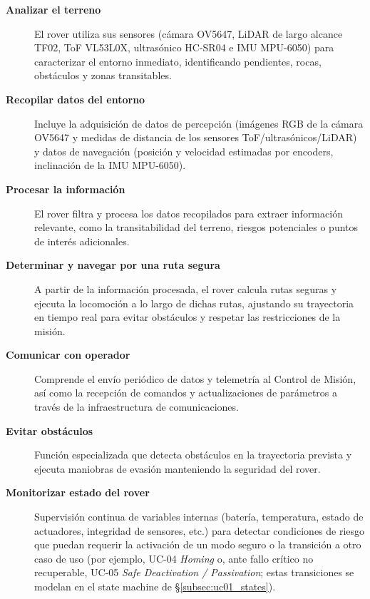 \begin{description}
  \item[\textbf{Analizar el terreno}]
  El rover utiliza sus sensores (cámara OV5647, LiDAR de largo alcance TF02, ToF VL53L0X, ultrasónico HC-SR04 e IMU MPU-6050) para caracterizar el entorno inmediato, identificando pendientes, rocas, obstáculos y zonas transitables.

  \item[\textbf{Recopilar datos del entorno}]
  Incluye la adquisición de datos de percepción (imágenes RGB de la cámara OV5647 y medidas de distancia de los sensores ToF/ultrasónicos/LiDAR) y datos de navegación (posición y velocidad estimadas por encoders, inclinación de la IMU MPU-6050).

  \item[\textbf{Procesar la información}] 
  El rover filtra y procesa los datos recopilados para extraer información relevante, 
  como la transitabilidad del terreno, riesgos potenciales o puntos de interés adicionales.

  \item[\textbf{Determinar y navegar por una ruta segura}] 
  A partir de la información procesada, el rover calcula rutas seguras y ejecuta la locomoción a lo largo de dichas rutas,
  ajustando su trayectoria en tiempo real para evitar obstáculos y respetar las restricciones de la misión.

  \item[\textbf{Comunicar con operador}] 
  Comprende el envío periódico de datos y telemetría al Control de Misión, 
  así como la recepción de comandos y actualizaciones de parámetros a través de la infraestructura de comunicaciones.

  \item[\textbf{Evitar obstáculos}] 
  Función especializada que detecta obstáculos en la trayectoria prevista 
  y ejecuta maniobras de evasión manteniendo la seguridad del rover.

    \item[\textbf{Monitorizar estado del rover}]
  Supervisión continua de variables internas (batería, temperatura, estado de actuadores, integridad de sensores, etc.) para detectar condiciones de riesgo que puedan requerir la activación de un modo seguro o la transición a otro caso de uso (por ejemplo, UC-04 \emph{Homing} o, ante fallo crítico no recuperable, UC-05 \emph{Safe Deactivation / Passivation}; estas transiciones se modelan en el state machine de \S\ref{subsec:uc01_states}).
  \end{description}
  

